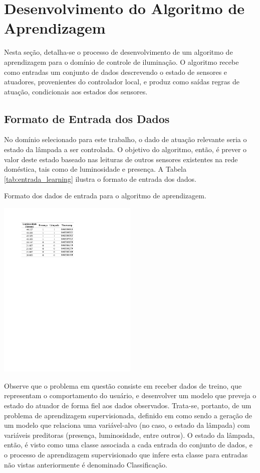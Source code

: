 \section{Desenvolvimento do Algoritmo de Aprendizagem}
Nesta seção, detalha-se o processo de desenvolvimento de um algoritmo de aprendizagem para o domínio de controle de iluminação. O algoritmo recebe como entradas um conjunto de dados descrevendo o estado de sensores e atuadores, provenientes do controlador local, e produz como saídas regras de atuação, condicionais aos estados dos sensores.

\subsection{Formato de Entrada dos Dados}\label{subsec:formatoentrada}
No domínio selecionado para este trabalho, o dado de atuação relevante seria o estado da lâmpada a ser controlada. O objetivo do algoritmo, então, é prever o valor deste estado baseado nas leituras de outros sensores existentes na rede doméstica, tais como de luminosidade e presença. A Tabela \ref{tab:entrada_learning} ilustra o formato de entrada dos dados.

\begin{table}[h]
	\centering
	\caption{Formato dos dados de entrada para o algoritmo de aprendizagem.}\smallskip
	\label{tab:entrada_learning}
	\includegraphics[width=0.5\textwidth]{tabelas/entrada_learning.pdf}
\end{table}

Observe que o problema em questão consiste em receber dados de treino, que representam o comportamento do usuário, e desenvolver um modelo que preveja o estado do atuador de forma fiel aos dados observados. Trata-se, portanto, de um problema de aprendizagem supervisionada, definido em \cite{james2014} como sendo a geração de um modelo que relaciona uma variável-alvo (no caso, o estado da lâmpada) com variáveis preditoras (presença, luminosidade, entre outros). O estado da lâmpada, então, é visto como uma classe associada a cada entrada do conjunto de dados, e o processo de aprendizagem supervisionado que infere esta classe para entradas não vistas anteriormente é denominado Classificação.

